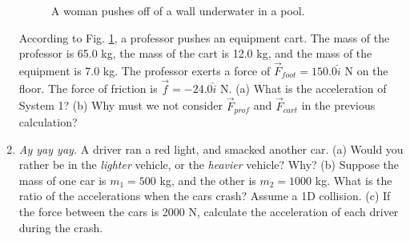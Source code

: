 \documentclass{article}
\begin{document}
\begin{enumerate}
\begin{figure}[ht]
\caption{\label{fig:cart} A woman pushes off of a wall underwater in a pool.}
\end{figure}
According to Fig. \ref{fig:cart}, a professor pushes an equipment cart.  The mass of the professor is 65.0 kg, the mass of the cart is 12.0 kg, and the mass of the equipment is 7.0 kg.  The professor exerts a force of $\vec{F}_{foot} = 150.0 \hat{i}$ N on the floor.  The force of friction is $\vec{f} = -24.0\hat{i}$ N.  (a) What is the acceleration of System 1? (b) Why must we not consider $\vec{F}_{prof}$ and $\vec{F}_{cart}$ in the previous calculation? \\ \vspace{2.5cm}
\item \textit{Ay yay yay.}  A driver ran a red light, and smacked another car.  (a) Would you rather be in the \textit{lighter} vehicle, or the \textit{heavier} vehicle?  Why? (b) Suppose the mass of one car is $m_1 = 500$ kg, and the other is $m_2 = 1000$ kg.  What is the ratio of the accelerations when the cars crash?  Assume a 1D collision. (c) If the force between the cars is 2000 N, calculate the acceleration of each driver during the crash.
\end{enumerate}
\end{document}
